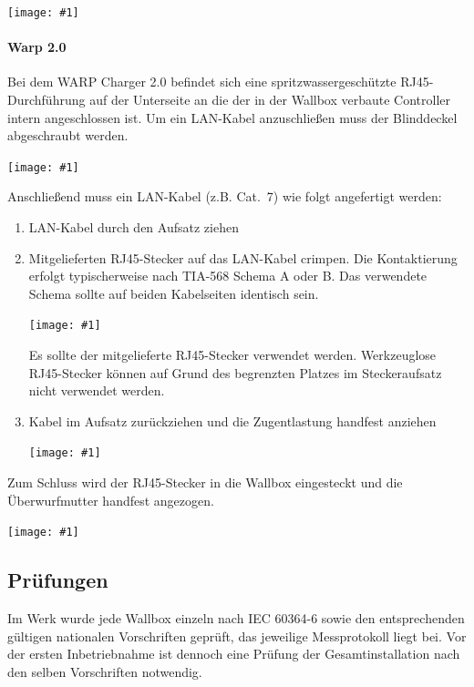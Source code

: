 \documentclass[a4paper,10pt]{article}
\newcommand{\hint}[1]{\begin{tcolorbox}[colback=boxgray,colframe=black,coltext=
white,title=Hinweis,left*=2mm,right*=2mm,boxsep=1mm,bottom=1mm,top=1mm]#1\end{tcolorbox}}
\newcommand{\gfx}[1]{\texttt{[image: \#1]}}
\begin{document}
\begin{multicols*}{2}
	\gfx{./img_warp2/resized/warp2_1_top_ready_1000.jpg} %

	\paragraph{Warp 2.0}

	Bei dem WARP Charger 2.0 befindet sich eine spritzwassergeschützte
	RJ45-Durchführung auf der Unterseite an die der in der Wallbox verbaute Controller intern
	angeschlossen ist. Um ein LAN-Kabel anzuschließen muss der Blinddeckel
	abgeschraubt werden.

	\gfx{./img_warp2/resized/warp2_ethernet3_circle_600} %

	Anschließend muss ein LAN-Kabel (z.B. Cat.~7) wie folgt
	angefertigt werden:

	\columnbreak

	\begin{enumerate}
		\item LAN-Kabel durch den Aufsatz ziehen
		\item Mitgelieferten RJ45-Stecker auf das LAN-Kabel crimpen. Die
		Kontaktierung erfolgt typischerweise nach TIA-568 Schema A oder B.
		Das verwendete Schema sollte auf beiden Kabelseiten identisch sein.

		\gfx{./img_warp2/resized/warp2_rj45_1_600}
		\hint{Es sollte der mitgelieferte RJ45-Stecker verwendet werden. Werkzeuglose RJ45-Stecker können auf Grund des begrenzten
		Platzes im Steckeraufsatz nicht verwendet werden.}

		\item Kabel im Aufsatz zurückziehen und die Zugentlastung handfest anziehen

		\gfx{./img_warp2/resized/warp2_rj45_2_600}
	\end{enumerate}

	Zum Schluss wird der RJ45-Stecker in die Wallbox eingesteckt und die Überwurfmutter
	handfest angezogen.

	\gfx{./img_warp2/resized/warp2_ethernet4_600} %

	\newpage
	\subsection{Prüfungen}\label{tests}
	Im Werk wurde jede Wallbox einzeln nach IEC 60364-6 sowie den entsprechenden gültigen
	nationalen Vorschriften geprüft, das jeweilige Messprotokoll liegt bei.
	Vor der ersten Inbetriebnahme ist dennoch eine Prüfung der Gesamtinstallation
	nach den selben Vorschriften notwendig.


\end{multicols*}
\end{document}
